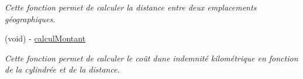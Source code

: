 \begin{DoxyCompactItemize}
\begin{DoxyCompactList}\small\item\em Cette fonction permet de calculer la distance entre deux emplacements géographiques. \end{DoxyCompactList}\item 
\hypertarget{interface_indemnites_table_view_controller_ae13cf1fc48417a8ccec916e68ccbecf5}{}(void) -\/ \hyperlink{interface_indemnites_table_view_controller_ae13cf1fc48417a8ccec916e68ccbecf5}{calcul\+Montant}\label{interface_indemnites_table_view_controller_ae13cf1fc48417a8ccec916e68ccbecf5}

\begin{DoxyCompactList}\small\item\em Cette fonction permet de calculer le coût d\textquotesingle{}une indemnité kilométrique en fonction de la cylindrée et de la distance. \end{DoxyCompactList}\end{DoxyCompactItemize}
